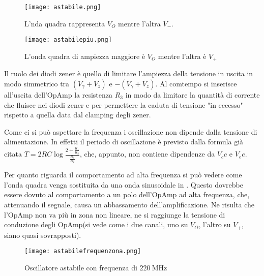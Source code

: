 \begin{figure}[h]
	\centering
	\texttt{[image: astabile.png]}
	\caption{L'nda quadra rappresenta $V_O$ mentre l'altra $V_-$.}
	\label{f:astabile}
\end{figure}

\begin{figure}[h]
	\centering
	\texttt{[image: astabilepiu.png]}
	\caption{L'onda quadra di ampiezza maggiore è $V_O$ mentre l'altra è $V_+$}
	\label{f:astabile+}
\end{figure}

Il ruolo dei diodi zener è quello di limitare l'ampiezza della tensione in uscita in modo simmetrico tra $(V_\gamma + V_z)$ e $-(V_\gamma + V_z)$. Al comtempo si inserisce all'uscita dell'OpAmp la resistenza $R_3$ in modo da limitare la quantità di corrente che fluisce nei diodi zener e per permettere la caduta di tensione "in eccesso" rispetto a quella data dal clamping degli zener.


Come ci si può aspettare la frequenza i oscillazione non dipende dalla tensione di alimentazione. In effetti il periodo di oscillazione è previsto dalla formula già citata $T=2RC\log\frac{2+\frac{R_1}{R_2}}{\frac{R_1}{R_2}}$, che, appunto, non contiene dipendenze da $V_cc$ e $V_ee$.


Per quanto riguarda il comportamento ad alta frequenza si può vedere come l'onda quadra venga sostituita da una onda sinusoidale in . Questo dovrebbe essere dovuto al comportamento a un polo dell'OpAmp ad alta frequenza, che, attenuando il segnale, causa un abbassamento dell'amplificazione. Ne risulta che l'OpAmp non va più in zona non lineare, ne si raggiunge la tensione di conduzione degli OpAmp(si vede come i due canali, uno su $V_O$, l'altro su $V_+$, siano quasi sovrapposti).

\begin{figure}[h]
	\centering
	\texttt{[image: astabilefrequenzona.png]}
	\caption{Oscillatore astabile con frequenza di $\SI{220}{\mega\Hz}$}
	\label{f:freqzona}
\end{figure}

